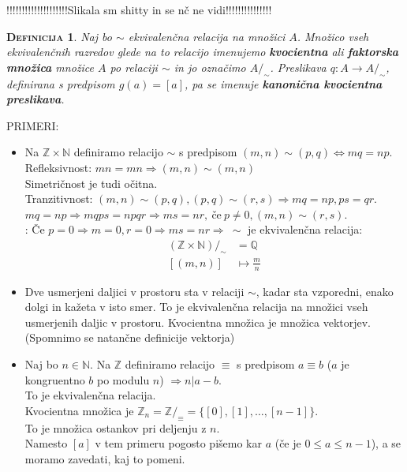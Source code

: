 \documentclass[a4paper,12pt]{article}
\newtheorem*{definicija}{\textsc{Definicija}}
\begin{document}
!!!!!!!!!!!!!!!!!!!!Slikala sm shitty in se nč ne vidi!!!!!!!!!!!!!!! \\

\begin{definicija}
Naj bo $\sim$ ekvivalenčna relacija na množici $A$. Množico vseh ekvivalenčnih razredov glede na to relacijo imenujemo \textbf{kvocientna} ali \textbf{faktorska množica} množice $A$ po relaciji $\sim$ in jo označimo $A/_\sim$. Preslikava $q:A\to A/_\sim$, definirana s predpisom $g(a)=[a]$, pa se imenuje \textbf{kanonična kvocientna preslikava}. \\
\end{definicija}

\newpage 

PRIMERI:
\begin{itemize}
\item Na $\mathbb{Z}\times \mathbb{N}$ definiramo relacijo $\sim$ s predpisom $(m,n)\sim(p,q)\Leftrightarrow mq=np$.\\

Refleksivnost: $mn=mn\Rightarrow (m,n)\sim(m,n)$ \\

Simetričnost je tudi očitna.\\

Tranzitivnost: $(m,n)\sim(p,q),(p,q)\sim(r,s)\Rightarrow mq=np,ps=qr$. \\


$mq=np \Rightarrow mqps=npqr \Rightarrow ms=nr, ~\text{če}~ p \neq 0, (m,n)\sim(r,s)$. \\

: Če $p=0 \Rightarrow m=0,r=0 \Rightarrow ms=nr \Rightarrow ~ \sim$ je ekvivalenčna relacija:
\begin{align*}
(\mathbb{Z}\times \mathbb{N})/_\sim & = \mathbb{Q} \\
[(m,n)] & \mapsto \frac{m}{n}
\end{align*}

\item Dve usmerjeni daljici v prostoru sta v relaciji $\sim$, kadar sta vzporedni, enako dolgi in kažeta v isto smer. To je ekvivalenčna relacija na množici vseh usmerjenih daljic v prostoru. Kvocientna množica je množica vektorjev. (Spomnimo se natančne definicije vektorja) \\

\item Naj bo $n\in \mathbb{N}$. Na $\mathbb{Z}$ definiramo relacijo $\equiv$ s predpisom $a\equiv b$ ($a$ je kongruentno $b$ po modulu $n$) $\Rightarrow n | a-b$. \\

To je ekvivalenčna relacija.\\

Kvocientna množica je $\mathbb{Z}_n=\mathbb{Z}/_\equiv = \{[0],[1],\ldots,[n-1]\}$. \\

To je množica ostankov pri deljenju z $n$. \\

Namesto $[a]$ v tem primeru pogosto pišemo kar $a$ (če je $0\leq a \leq n-1$), a se moramo zavedati, kaj to pomeni. \\
\end{itemize}
\end{document}

